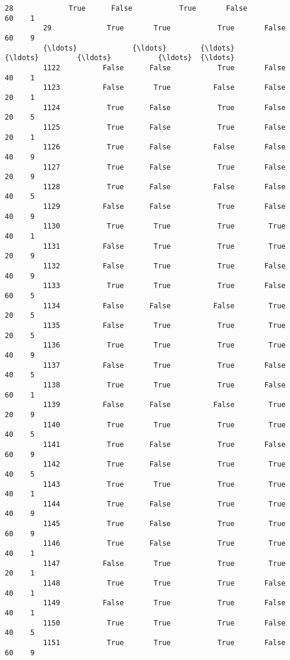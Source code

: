 \documentclass[11pt]{article}
\begin{document}
\begin{Verbatim}[commandchars=\\\{\}]
         28             True      False           True       False            60    1   
         29             True       True           True       False            60    9   
         {\ldots}             {\ldots}        {\ldots}            {\ldots}         {\ldots}           {\ldots}  {\ldots}   
         1122          False      False           True       False            40    1   
         1123          False       True          False       False            20    1   
         1124           True      False           True       False            20    5   
         1125           True      False           True       False            20    1   
         1126           True      False          False       False            40    9   
         1127           True      False           True       False            20    9   
         1128           True      False          False       False            40    5   
         1129          False      False           True       False            40    9   
         1130           True       True           True        True            40    1   
         1131          False       True           True        True            20    9   
         1132          False       True           True       False            40    9   
         1133           True       True           True       False            60    5   
         1134          False      False          False        True            20    5   
         1135          False       True           True        True            20    5   
         1136           True       True           True        True            40    9   
         1137          False       True           True       False            40    5   
         1138           True       True           True       False            60    1   
         1139          False      False          False        True            20    9   
         1140           True       True           True        True            40    5   
         1141           True      False           True       False            60    9   
         1142           True      False           True        True            40    5   
         1143           True       True           True        True            40    1   
         1144           True      False           True        True            40    9   
         1145           True      False           True        True            60    9   
         1146           True      False           True        True            40    1   
         1147          False       True           True        True            20    1   
         1148           True       True           True       False            40    1   
         1149          False       True           True       False            40    1   
         1150           True       True           True       False            40    5   
         1151           True       True           True       False            60    9   
         

\end{Verbatim}
\end{document}
